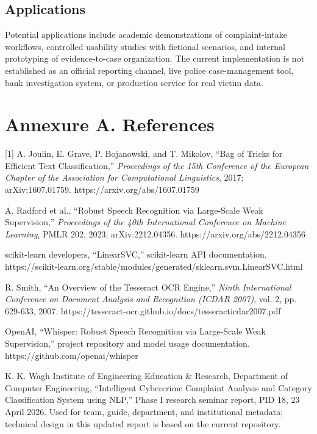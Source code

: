 \documentclass[12pt,a4paper,oneside]{report}
\begin{document}
\section{Applications}
Potential applications include academic demonstrations of complaint-intake workflows, controlled usability studies with fictional scenarios, and internal prototyping of evidence-to-case organization. The current implementation is not established as an official reporting channel, live police case-management tool, bank investigation system, or production service for real victim data.\par\medskip
\clearpage\chapter*{Annexure A. References}
[1] A. Joulin, E. Grave, P. Bojanowski, and T. Mikolov, ``Bag of Tricks for Efficient Text Classification,'' \emph{Proceedings of the 15th Conference of the European Chapter of the Association for Computational Linguistics}, 2017; arXiv:1607.01759. https://arxiv.org/abs/1607.01759\par\medskip
[2] A. Radford et al., ``Robust Speech Recognition via Large-Scale Weak Supervision,'' \emph{Proceedings of the 40th International Conference on Machine Learning}, PMLR 202, 2023; arXiv:2212.04356. https://arxiv.org/abs/2212.04356\par\medskip
[3] scikit-learn developers, ``LinearSVC,'' scikit-learn API documentation. https://scikit-learn.org/stable/modules/generated/sklearn.svm.LinearSVC.html\par\medskip
[4] R. Smith, ``An Overview of the Tesseract OCR Engine,'' \emph{Ninth International Conference on Document Analysis and Recognition (ICDAR 2007)}, vol. 2, pp. 629-633, 2007. https://tesseract-ocr.github.io/docs/tesseracticdar2007.pdf\par\medskip
[5] OpenAI, ``Whisper: Robust Speech Recognition via Large-Scale Weak Supervision,'' project repository and model usage documentation. https://github.com/openai/whisper\par\medskip
[6] K. K. Wagh Institute of Engineering Education \& Research, Department of Computer Engineering, ``Intelligent Cybercrime Complaint Analysis and Category Classification System using NLP,'' Phase I research seminar report, PID 18, 23 April 2026. Used for team, guide, department, and institutional metadata; technical design in this updated report is based on the current repository.\par\medskip
\end{document}
